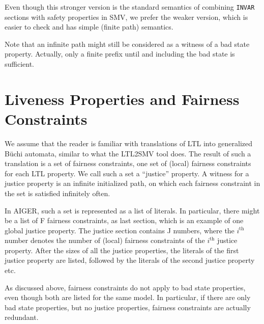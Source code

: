 \documentclass{llncs}
\begin{document}
Even though this stronger version is the standard semantics of combining
\texttt{INVAR} sections with safety properties in SMV, we prefer the weaker
version, which is easier to check and has simple (finite path) semantics.

Note that an infinite path might still be considered as a witness of a bad
state property.  Actually, only a finite prefix until and including the bad
state is sufficient.

\section{Liveness Properties and Fairness Constraints}

We assume that the reader is familiar with translations of LTL into
generalized B\"{u}chi automata, similar to what the LTL2SMV tool does.
The result of such a translation is a set of fairness constraints, one set
of (local) fairness constraints for each LTL property.  We call such a set
a ``justice'' property.  A witness for a justice property is an infinite
initialized path, on which each fairness constraint in the set is satisfied
infinitely often.

In AIGER, such a set is represented as a list of literals.  In particular,
there might be a list of F fairness constraints, as last section, which is
an example of one global justice property.  The justice section contains J
numbers, where the $i^{\mathrm{th}}$ number denotes the number of (local)
fairness constraints of the $i^\mathrm{th}$ justice property.  After the
sizes of all the justice properties, the literals of the first justice
property are listed, followed by the literals of the second justice property
etc.

As discussed above, fairness constraints do not apply to bad state
properties, even though both are listed for the same model.  In particular,
if there are only bad state properties, but no justice properties, fairness
constraints are actually redundant.
\end{document}
